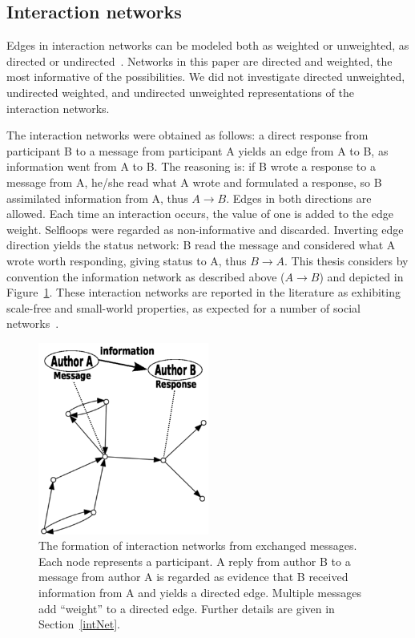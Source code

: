 \documentclass[review]{elsarticle}
\begin{document}
\subsection{Interaction networks}
Edges in interaction networks can be modeled both as weighted or unweighted, as directed or undirected~\cite{bird,newmanCommunityDirected,newmanCommunity2013}.
Networks in this paper are directed and weighted, the most informative of the possibilities. We did not investigate directed unweighted, undirected weighted, and undirected unweighted representations of the interaction networks. 

The interaction networks were obtained as follows: a direct response from participant B to a message from participant A yields an edge from A to B, as information went from A to B. The reasoning is: if B wrote a response to a message from A, he/she read what A wrote and formulated a response, so B assimilated information from A, thus $A \rightarrow B$.
Edges in both directions are allowed. Each time an interaction occurs, the value of one is added to the edge weight. Selfloops were regarded as non-informative and discarded. Inverting edge direction yields the status network: B read the message and considered what A wrote worth responding, giving status to A, thus $B\rightarrow A$. This thesis considers by convention the information network as described above ($A\rightarrow B$) and depicted in Figure~\ref{formationNetwork}. These interaction networks are reported in the literature as exhibiting scale-free and small-world properties, as expected for a number of social networks~\cite{bird,newmanBook}.

\begin{figure}[!h]
\centering
\includegraphics[width=0.5\textwidth]{figs/criaRede3_}
\caption{The formation of interaction networks from exchanged messages. Each node represents a participant. A reply from author B to a message from author A is regarded as evidence that B received information from A and yields a directed edge. Multiple messages add ``weight'' to a directed edge. Further details are given in Section~\ref{intNet}.}
\label{formationNetwork}
\end{figure}
\end{document}
